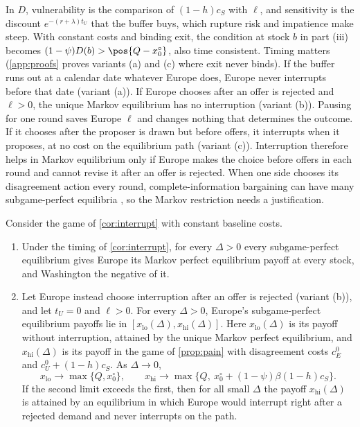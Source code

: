 In $D$, vulnerability is the comparison of $(1-h)c_S$ with $\ell$, and sensitivity is the discount $e^{-(r+\lambda)t_U}$ that the buffer buys, which rupture risk and impatience make steep. With constant costs and binding exit, the condition at stock $b$ in part (iii) becomes $(1-\psi)D(b)>\pos{Q-x^\circ_0}$, also time consistent. Timing matters (\cref{app:proofs} proves variants (a) and (c) where exit never binds). If the buffer runs out at a calendar date whatever Europe does, Europe never interrupts before that date (variant (a)). If Europe chooses after an offer is rejected and $\ell>0$, the unique Markov equilibrium has no interruption (variant (b)). Pausing for one round saves Europe $\ell$ and changes nothing that determines the outcome. If it chooses after the proposer is drawn but before offers, it interrupts when it proposes, at no cost on the equilibrium path (variant (c)). Interruption therefore helps in Markov equilibrium only if Europe makes the choice before offers in each round and cannot revise it after an offer is rejected. When one side chooses its disagreement action every round, complete-information bargaining can have many subgame-perfect equilibria \citep{fernandez1991striking, haller1990letter, busch1995perfect}, so the Markov restriction needs a justification.

\begin{proposition}\label{prop:range}
Consider the game of \cref{cor:interrupt} with constant baseline costs.
\begin{enumerate}[label=(\roman*)]
\item Under the timing of \cref{cor:interrupt}, for every $\Delta>0$ every subgame-perfect equilibrium gives Europe its Markov perfect equilibrium payoff at every stock, and Washington the negative of it.
\item Let Europe instead choose interruption after an offer is rejected (variant (b)), and let $t_U=0$ and $\ell>0$. For every $\Delta>0$, Europe's subgame-perfect equilibrium payoffs lie in $[x_{\mathrm{lo}}(\Delta),x_{\mathrm{hi}}(\Delta)]$. Here $x_{\mathrm{lo}}(\Delta)$ is its payoff without interruption, attained by the unique Markov perfect equilibrium, and $x_{\mathrm{hi}}(\Delta)$ is its payoff in the game of \cref{prop:pain} with disagreement costs $c^0_E$ and $c^0_U+(1-h)c_S$. As $\Delta\to0$,
\[ x_{\mathrm{lo}}\to\max\{Q,x^\circ_0\},\qquad x_{\mathrm{hi}}\to\max\{Q,\ x^\circ_0+(1-\psi)\beta(1-h)c_S\}. \]
If the second limit exceeds the first, then for all small $\Delta$ the payoff $x_{\mathrm{hi}}(\Delta)$ is attained by an equilibrium in which Europe would interrupt right after a rejected demand and never interrupts on the path.
\end{enumerate}
\end{proposition}

